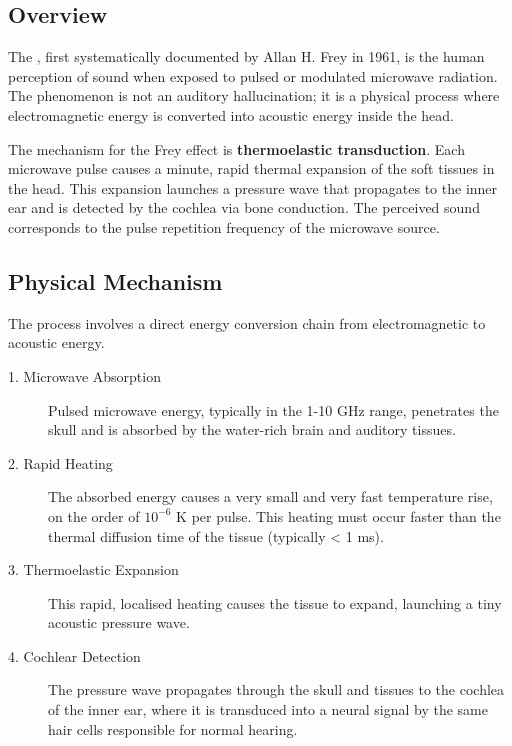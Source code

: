 \subsection{Overview}

The , first systematically documented by Allan H. Frey in 1961, is the human perception of sound when exposed to pulsed or modulated microwave radiation. The phenomenon is not an auditory hallucination; it is a physical process where electromagnetic energy is converted into acoustic energy inside the head.

\begin{keyconcept}
    The mechanism for the Frey effect is \textbf{thermoelastic transduction}. Each microwave pulse causes a minute, rapid thermal expansion of the soft tissues in the head. This expansion launches a pressure wave that propagates to the inner ear and is detected by the cochlea via bone conduction. The perceived sound corresponds to the pulse repetition frequency of the microwave source.
\end{keyconcept}


\subsection{Physical Mechanism}

The process involves a direct energy conversion chain from electromagnetic to acoustic energy.

\begin{description}
    \item[1. Microwave Absorption] Pulsed microwave energy, typically in the 1-10 GHz range, penetrates the skull and is absorbed by the water-rich brain and auditory tissues.
    \item[2. Rapid Heating] The absorbed energy causes a very small and very fast temperature rise, on the order of $10^{-6}$ K per pulse. This heating must occur faster than the thermal diffusion time of the tissue (typically < 1 ms).
    \item[3. Thermoelastic Expansion] This rapid, localised heating causes the tissue to expand, launching a tiny acoustic pressure wave.
    \item[4. Cochlear Detection] The pressure wave propagates through the skull and tissues to the cochlea of the inner ear, where it is transduced into a neural signal by the same hair cells responsible for normal hearing.
\end{description}

